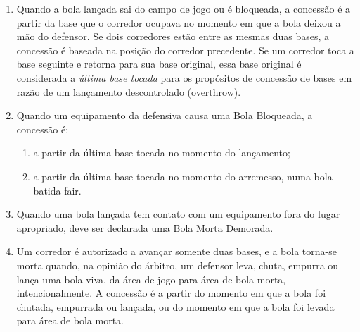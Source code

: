 \begin{multicols}{2}
\begin{enumerate}[label=\alph*)]
\begin{enumerate}[label=\roman* -]
\begin{enumerate}[label=\arabic*)]
\begin{enumerate}[label=\alph*)]
				\item  por um corredor, depois de ter passado um defensor, exceto arremessador, e desde que nenhum outro defensor tenha tido uma chance de fazer um \gls{out} e a bola tenha ficado fora de jogo em territ\'orio \gls{foul}. 
			\end{enumerate}
			\item Quando uma bola batida \gls{fair} tem contato com um defensor que est\'a em territ\'orio de bola morta e, na opini\~ao do \'arbitro, a bola n\~ao teria passado sobre a cerca em territ\'orio \gls{fair}. 
		\end{enumerate}
		\item Quando a bola lan\c{c}ada sai do campo de jogo ou \'e bloqueada, a concess\~ao \'e a partir da base que o corredor ocupava no momento em que a bola deixou a m\~ao do defensor. Se dois corredores est\~ao entre as mesmas duas bases, a concess\~ao \'e baseada na posi\c{c}\~ao do corredor precedente. Se um corredor toca a base seguinte e retorna para sua base original, essa base original \'e considerada a \textsl{\'ultima base tocada} para os prop\'ositos de concess\~ao de bases em raz\~ao de um lan\c{c}amento descontrolado (\gls{overthrow}). 
		
		\item Quando um equipamento da defensiva causa uma Bola Bloqueada, a concess\~ao \'e: 
		
		\begin{enumerate}[label=\arabic*)]
			\item a partir da \'ultima base tocada no momento do lan\c{c}amento; 
			\item a partir da \'ultima base tocada no momento do arremesso, numa bola batida \gls{fair}. 
		\end{enumerate}	
		\item Quando uma bola lan\c{c}ada tem contato com um equipamento fora do lugar apropriado, deve ser declarada uma Bola Morta Demorada. 
		
		\item Um corredor \'e autorizado a avan\c{c}ar somente duas bases, e a bola torna-se morta quando, na opini\~ao do \'arbitro, um defensor leva, chuta, empurra ou lan\c{c}a uma bola viva, da \'area de jogo para \'area de bola morta, intencionalmente. A concess\~ao \'e a partir do momento em que a bola foi chutada, empurrada ou lan\c{c}ada, ou do momento em que a bola foi levada para \'area de bola morta. 
	\end{enumerate}
	

\end{enumerate}
\end{multicols}

